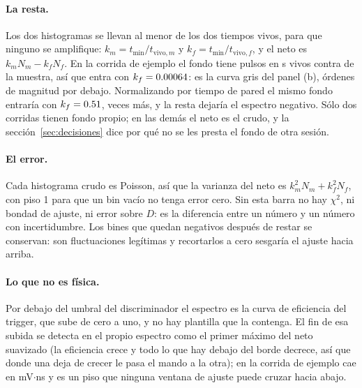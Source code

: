 \documentclass[11pt,a4paper]{article}
\begin{document}
\paragraph{La resta.} Los dos histogramas se llevan al menor de los dos
tiempos vivos, para que ninguno se amplifique: $k_m = t_{\min}/t_{\text{vivo},m}$ y
$k_f = t_{\min}/t_{\text{vivo},f}$, y el neto es $k_m N_m - k_f N_f$. En la
corrida de ejemplo el fondo tiene \EjNFondo{} pulsos en \EjTVivoFondo{} s
vivos contra \EjTVivo{} de la muestra, así que entra con $k_f = 0.00064$: es la
curva gris del panel (b), órdenes de magnitud por debajo. Normalizando por
tiempo de pared el mismo fondo entraría con $k_f = 0.51$, \EjFactorVivo{}
veces más, y la resta dejaría el espectro negativo. Sólo dos corridas tienen fondo propio; en las demás el neto
es el crudo, y la sección~\ref{sec:decisiones} dice por qué no se les presta
el fondo de otra sesión.

\paragraph{El error.} Cada histograma crudo es Poisson, así que la varianza del
neto es $k_m^2 N_m + k_f^2 N_f$, con piso 1 para que un bin vacío no tenga
error cero. Sin esta barra no hay $\chi^2$, ni bondad de ajuste, ni error
sobre $D$: es la diferencia entre un número y un número con incertidumbre.
Los bines que quedan negativos después de restar se conservan: son
fluctuaciones legítimas y recortarlos a cero sesgaría el ajuste hacia arriba.

\paragraph{Lo que no es física.} Por debajo del umbral del discriminador el
espectro es la curva de eficiencia del trigger, que sube de cero a uno, y no
hay plantilla que la contenga. El fin de esa subida se detecta en el propio
espectro como el primer máximo del neto suavizado (la eficiencia crece y todo
lo que hay debajo del borde decrece, así que donde una deja de crecer le pasa
el mando a la otra); en la corrida de ejemplo cae en \EjUmbral{} mV$\cdot$ns y
es un piso que ninguna ventana de ajuste puede cruzar hacia abajo.

\begin{center}
\label{tab:pulsos}
{\footnotesize\setlength{\tabcolsep}{3.5pt}}
\end{center}
\end{document}
